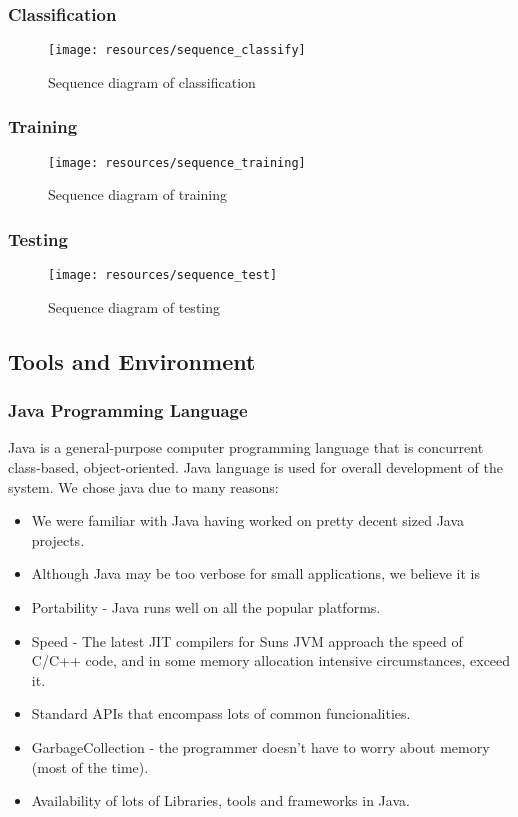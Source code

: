 \subsubsection{Classification}
\begin{figure}[h!]
        \centering
        \texttt{[image: resources/sequence\_classify]}
        \caption{Sequence diagram of classification}
        \label{fig:sequence_classify}
\end{figure}
\newpage
\subsubsection{Training}
\begin{figure}[h!]
        \centering
        \texttt{[image: resources/sequence\_training]}
        \caption{Sequence diagram of training}
        \label{fig:sequence_training}
\end{figure}
\newpage
\newpage
\subsubsection{Testing}
\begin{figure}[h!]
        \centering
        \texttt{[image: resources/sequence\_test]}
        \caption{Sequence diagram of testing}
        \label{fig:sequence_test}
\end{figure}


\subsection{Tools and Environment}

\subsubsection{Java Programming Language}

Java is a general-purpose computer programming language that is concurrent class-based, object-oriented. 
Java language is used for overall development of the system.
We chose java due to many reasons:

\begin{itemize}
    \item We were familiar with Java having worked on pretty decent sized Java projects.
    \item Although Java may be too verbose for small applications, we believe it is 
    \item Portability - Java runs well on all the popular platforms.
    \item Speed - The latest JIT compilers for Suns JVM approach the speed of C/C++ code, and in some memory allocation intensive circumstances, exceed it.
    \item Standard APIs that encompass lots of common funcionalities.
    \item GarbageCollection - the programmer doesn't have to worry about memory (most of the time).
    \item Availability of lots of Libraries, tools and frameworks in Java.
\end{itemize}

